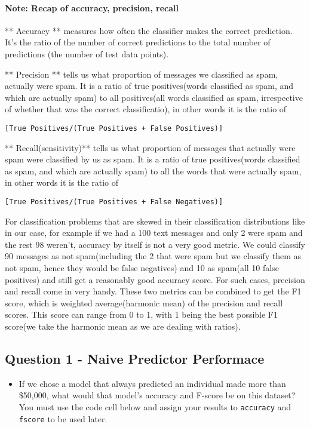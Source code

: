 \documentclass[11pt]{article}
\providecommand{\tightlist}{%
      \setlength{\itemsep}{0pt}\setlength{\parskip}{0pt}}
\begin{document}
\paragraph{Note: Recap of accuracy, precision,
recall}\label{note-recap-of-accuracy-precision-recall}

** Accuracy ** measures how often the classifier makes the correct
prediction. It's the ratio of the number of correct predictions to the
total number of predictions (the number of test data points).

** Precision ** tells us what proportion of messages we classified as
spam, actually were spam. It is a ratio of true positives(words
classified as spam, and which are actually spam) to all positives(all
words classified as spam, irrespective of whether that was the correct
classificatio), in other words it is the ratio of

\texttt{{[}True\ Positives/(True\ Positives\ +\ False\ Positives){]}}

** Recall(sensitivity)** tells us what proportion of messages that
actually were spam were classified by us as spam. It is a ratio of true
positives(words classified as spam, and which are actually spam) to all
the words that were actually spam, in other words it is the ratio of

\texttt{{[}True\ Positives/(True\ Positives\ +\ False\ Negatives){]}}

For classification problems that are skewed in their classification
distributions like in our case, for example if we had a 100 text
messages and only 2 were spam and the rest 98 weren't, accuracy by
itself is not a very good metric. We could classify 90 messages as not
spam(including the 2 that were spam but we classify them as not spam,
hence they would be false negatives) and 10 as spam(all 10 false
positives) and still get a reasonably good accuracy score. For such
cases, precision and recall come in very handy. These two metrics can be
combined to get the F1 score, which is weighted average(harmonic mean)
of the precision and recall scores. This score can range from 0 to 1,
with 1 being the best possible F1 score(we take the harmonic mean as we
are dealing with ratios).

    \subsection{Question 1 - Naive Predictor
Performace}\label{question-1---naive-predictor-performace}

\begin{itemize}
\tightlist
\item
  If we chose a model that always predicted an individual made more than
  \$50,000, what would that model's accuracy and F-score be on this
  dataset? You must use the code cell below and assign your results to
  \texttt{\textquotesingle{}accuracy\textquotesingle{}} and
  \texttt{\textquotesingle{}fscore\textquotesingle{}} to be used later.
\end{itemize}
\end{document}
